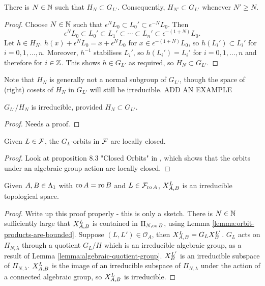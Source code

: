 \documentclass[a4paper, 11pt]{report}
\begin{document}
\begin{lemma}
There is $N\in\naturals$ such that $H_N\subset G_{L'}$. Consequently, $H_{N'}\subset G_{L'}$ whenever $N'\geq N$.
\end{lemma}

\begin{proof}
Choose $N\in\naturals$ such that $\epsilon^N L_0\subset L_0'\subset \epsilon^{-N}L_0$. Then
\begin{equation*}
\epsilon^N L_0 \subset L_0'\subset L_1'\subset\cdots\subset L_n' \subset \epsilon^{-(1+N)}L_0.
\end{equation*}
Let $h\in H_N$. $h(x) + \epsilon^N L_0 = x + \epsilon^N L_0$ for $x\in\epsilon^{-(1+N)} L_0$, so $h(L_i')\subset L_i'$ for $i=0,1,\ldots,n$. Moreover, $h^{-1}$ stabilises $L_i'$, so $h(L_i') = L_i'$ for $i=0,1,\ldots,n$ and therefore for $i\in\integers$. This shows $h\in G_{L'}$ as required, so $H_N\subset G_{L'}$.
\end{proof}

Note that $H_N$ is generally not a normal subgroup of $G_{L'}$, though the space of (right) cosets of $H_N$ in $G_{L'}$ will still be irreducible. {\color{blue}
ADD AN EXAMPLE}

{\color{blue}
\begin{lemma}
$G_{L'}/H_N$ is irreducible, provided $H_N\subset G_{L'}$.
\end{lemma}

\begin{proof}
Needs a proof.
\end{proof}
}

\begin{lemma}\label{lemma:locally-closed-orbits}
Given $L\in\flags$, the $G_L$-orbits in $\flags$ are locally closed.
\end{lemma}

{\color{blue}
\begin{proof}

Look at proposition 8.3 "Closed Orbits" in \cite{humphreys81}, which shows that the orbits under an algebraic group action are locally closed.
\end{proof}
}

\begin{lemma}\label{lemma:irreducible-product}
Given $A,B\in\matrices$ with $\co{A}=\ro{B}$ and $L\in\flags_{\ro{A}}$, $\xprod[L]{A,B}$ is an irreducible topological space.
\end{lemma}

{\color{blue}
\begin{proof}
Write up this proof properly - this is only a sketch. There is $N\in\naturals$ sufficiently large that $\xprod[L]{A,B}$ is contained in $\Pi_{N,\co{B}}$, using Lemma \ref{lemma:orbit-products-are-bounded}. Suppose $(L,L')\in\mathcal{O}_A$, then $\xprod[L]{A,B} = G_L \xprod[L']{B}$. $G_L$ acts on $\Pi_{N,\lambda}$ through a quotient $G_L/H$ which is an irreducible algebraic group, as a result of Lemma \ref{lemma:algebraic-quotient-group}. {\color{blue}$\xprod[L']{B}$ is an irreducible subspace of $\Pi_{N,\lambda}$}. $\xprod[L]{A,B}$ is the image of an irreducible subspace of $\Pi_{N,\lambda}$ under the action of a connected algebraic group, so $\xprod[L]{A,B}$ is irreducible.
\end{proof}
}
\end{document}
